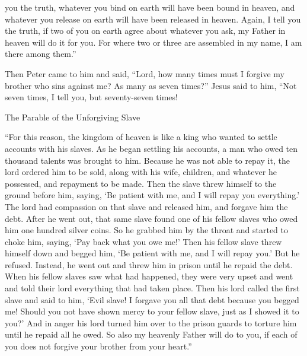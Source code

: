 {you
the truth,
whatever
you bind
on
earth
will have been
bound
in
heaven,
and
whatever
you release
on
earth
will have been
released
in
heaven.
Again,
I tell
you
the truth,
if
two
of
you
on
earth
agree
about
whatever
you ask,
my
Father
in
heaven will do it for you.
For
where
two
or
three
are
assembled
in
my
name,
I am
there
among
them.”
\par }{\PP {}Then
Peter
came
to him
and said,
“Lord,
how many times
must I forgive
my
brother
who sins
against
me? As many as
seven times?”
Jesus
said
to him,
“Not
seven times,
I tell
you,
but
seventy-seven times!
\par }{\SH The Parable of the Unforgiving Slave
\par }{\PP {}“For
this
reason, the kingdom
of heaven
is like
a king
who
wanted
to settle
accounts
with
his
slaves.
As
he began settling
his
accounts,
a man
who owed ten thousand
talents
was brought
to
him.
Because he was
not
able
to repay
it, the lord
ordered
him
to be sold, along
with his wife,
children,
and
whatever
he possessed,
and
repayment to be made.
Then
the slave
threw himself
to the ground
before him,
saying, ‘Be patient
with
me,
and
I will repay
you
everything.’
The lord
had compassion
on that
slave
and released
him,
and
forgave
him
the debt.
After
he went out,
that
same slave
found
one
of his
fellow slaves
who
owed
him
one hundred
silver coins.
So
he grabbed
him
by the throat and started to choke
him, saying,
‘Pay back
what
you owe me!’
Then
his
fellow slave
threw himself down
and begged
him, ‘Be patient
with
me,
and
I will repay
you.’
But
he refused.
Instead,
he went out
and threw
him
in
prison
until
he repaid
the debt.
When
his
fellow slaves
saw
what had happened,
they were
very
upset
and
went
and told
their
lord
everything
that had taken place.
Then
his
lord
called
the first slave
and said
to him,
‘Evil
slave! I forgave
you all
that
debt
because
you
begged
me!
Should you
not
have shown mercy
to your
fellow slave,
just as
I
showed
it to you?’
And
in anger
his
lord
turned
him
over
to the prison guards to torture
him until
he repaid
all
he owed.
So
also
my
heavenly
Father
will do
to you,
if
each
of you does
not
forgive
your brother
from
your
heart.”

}
